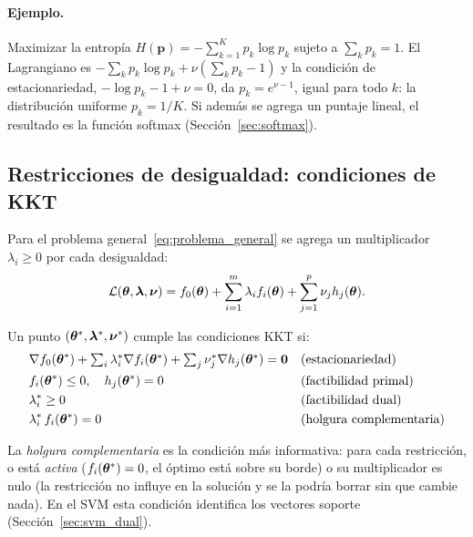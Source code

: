 \paragraph{Ejemplo.} Maximizar la entropía $H(\mathbf{p}) = -\sum_{k=1}^K p_k\log p_k$ sujeto a
$\sum_k p_k = 1$. El Lagrangiano es $-\sum_k p_k\log p_k + \nu(\sum_k p_k - 1)$ y la condición de estacionariedad,
$-\log p_k - 1 + \nu = 0$, da $p_k = e^{\nu - 1}$, igual para todo $k$: la distribución uniforme
$p_k = 1/K$. Si además se agrega un puntaje lineal, el resultado es la función softmax
(Sección~\ref{sec:softmax}).

\subsection{Restricciones de desigualdad: condiciones de KKT}

Para el problema general~\eqref{eq:problema_general} se agrega un multiplicador $\lambda_i \ge 0$ por cada
desigualdad:
\begin{equation}
  \mathcal{L}(\boldsymbol{\theta}, \boldsymbol\lambda, \boldsymbol\nu) = f_0(\boldsymbol{\theta}) + \sum_{i=1}^{m}\lambda_i f_i(\boldsymbol{\theta}) + \sum_{j=1}^{p}\nu_j h_j(\boldsymbol{\theta}).
  \label{eq:lagrangiano}
\end{equation}

\begin{definicion}
Un punto $(\boldsymbol{\theta}^*, \boldsymbol\lambda^*, \boldsymbol\nu^*)$ cumple las condiciones KKT si:
\begin{align}
  &\nabla f_0(\boldsymbol{\theta}^*) + \textstyle\sum_i \lambda_i^*\nabla f_i(\boldsymbol{\theta}^*) + \sum_j \nu_j^*\nabla h_j(\boldsymbol{\theta}^*) = \mathbf{0}
    && \text{(estacionariedad)} \\
  &f_i(\boldsymbol{\theta}^*) \le 0, \quad h_j(\boldsymbol{\theta}^*) = 0 && \text{(factibilidad primal)} \\
  &\lambda_i^* \ge 0 && \text{(factibilidad dual)} \\
  &\lambda_i^*\, f_i(\boldsymbol{\theta}^*) = 0 && \text{(holgura complementaria)}
  \label{eq:holgura}
\end{align}
\end{definicion}

La \emph{holgura complementaria} es la condición más informativa: para cada restricción, o está \emph{activa}
($f_i(\boldsymbol{\theta}^*) = 0$, el óptimo está sobre su borde) o su multiplicador es nulo (la restricción no influye en
la solución y se la podría borrar sin que cambie nada). En el SVM esta condición identifica los vectores
soporte (Sección~\ref{sec:svm_dual}).


